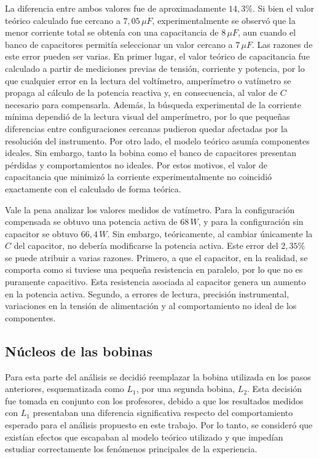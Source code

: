 La diferencia entre ambos valores fue de aproximadamente \(14{,}3\%\). Si bien el valor teórico calculado fue cercano a \(7{,}05\,\mu F\), experimentalmente se observó que la menor corriente total se obtenía con una capacitancia de \(8\,\mu F\), aun cuando el banco de capacitores permitía seleccionar un valor cercano a \(7\,\mu F\). Las razones de este error pueden ser varias. En primer lugar, el valor teórico de capacitancia fue calculado a partir de mediciones previas de tensión, corriente y potencia, por lo que cualquier error en la lectura del voltímetro, amperímetro o vatímetro se propaga al cálculo de la potencia reactiva y, en consecuencia, al valor de \(C\) necesario para compensarla. Además, la búsqueda experimental de la corriente mínima dependió de la lectura visual del amperímetro, por lo que pequeñas diferencias entre configuraciones cercanas pudieron quedar afectadas por la resolución del instrumento. Por otro lado, el modelo teórico asumía componentes ideales. Sin embargo, tanto la bobina como el banco de capacitores presentan pérdidas y comportamientos no ideales. Por estos motivos, el valor de capacitancia que minimizó la corriente experimentalmente no coincidió exactamente con el calculado de forma teórica.

Vale la pena analizar los valores medidos de vatímetro. Para la configuración compensada se obtuvo una potencia activa de \(68\,W\), y para la configuración sin capacitor se obtuvo \(66{,}4\,W\). Sin embargo, teóricamente, al cambiar únicamente la \(C\) del capacitor, no debería modificarse la potencia activa. Este error del \(2{,}35\%\) se puede atribuir a varias razones. Primero, a que el capacitor, en la realidad, se comporta como si tuviese una pequeña resistencia en paralelo, por lo que no es puramente capacitivo. Esta resistencia asociada al capacitor genera un aumento en la potencia activa. Segundo, a errores de lectura, precisión instrumental, variaciones en la tensión de alimentación y al comportamiento no ideal de los componentes.


\subsection{Núcleos de las bobinas}

Para esta parte del análisis se decidió reemplazar la bobina utilizada en los pasos anteriores, esquematizada como \(L_1\), por una segunda bobina, \(L_2\). Esta decisión fue tomada en conjunto con los profesores, debido a que los resultados medidos con \(L_1\) presentaban una diferencia significativa respecto del comportamiento esperado para el análisis propuesto en este trabajo. Por lo tanto, se consideró que existían efectos que escapaban al modelo teórico utilizado y que impedían estudiar correctamente los fenómenos principales de la experiencia.

